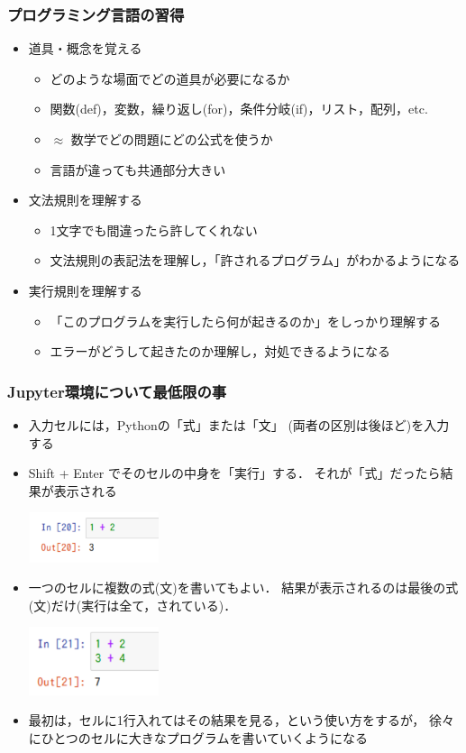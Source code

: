 \documentclass[10pt,dvipdfmx]{beamer}
\newcommand{\ao}[1]{{\color{blue}#1}}
\begin{document}
\begin{frame}
\frametitle{プログラミング言語の習得}
\begin{itemize}
\item \ao{道具・概念を覚える}
  \begin{itemize}
  \item どのような場面でどの道具が必要になるか
  \item 関数(def)，変数，繰り返し(for)，条件分岐(if)，リスト，配列，etc.
  \item $\approx$ 数学でどの問題にどの公式を使うか
  \item 言語が違っても共通部分大きい
  \end{itemize}

\item \ao{文法規則を理解する}
  \begin{itemize}
  \item 1文字でも間違ったら許してくれない
  \item 文法規則の表記法を理解し，「許されるプログラム」がわかるようになる
  \end{itemize}

\item \ao{実行規則を理解する}
  \begin{itemize}
  \item 「このプログラムを実行したら何が起きるのか」をしっかり理解する
  \item エラーがどうして起きたのか理解し，対処できるようになる
  \end{itemize}
\end{itemize}
\end{frame}


\begin{frame}
\frametitle{Jupyter環境について最低限の事}
\begin{itemize}
\item 入力セルには，Pythonの\ao{「式」}または\ao{「文」}
(両者の区別は後ほど)を入力する
\item Shift + Enter でそのセルの中身を\ao{「実行」}する．
それが「式」だったら結果が表示される

\includegraphics[width=0.3\textwidth]{out/pdf/img/cell_1_plus_2.pdf}

\item 一つのセルに複数の式(文)を書いてもよい．
結果が表示されるのは最後の式(文)だけ(実行は全て，されている)．

\includegraphics[width=0.3\textwidth]{out/pdf/img/cell_1_plus_2_3_plus_4.pdf}

\item 最初は，セルに1行入れてはその結果を見る，という使い方をするが，
徐々にひとつのセルに大きなプログラムを書いていくようになる
\end{itemize}
\end{frame}
\end{document}
